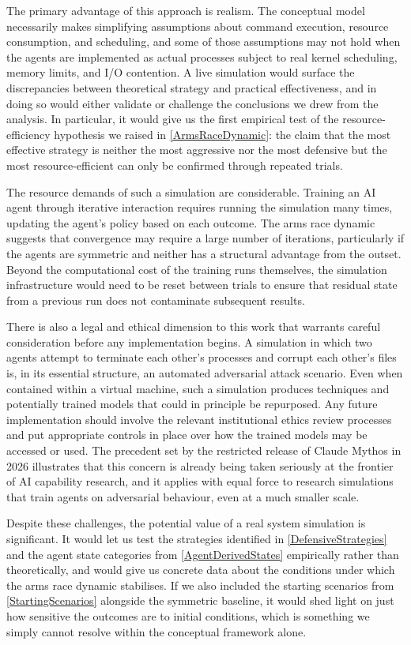 The primary advantage of this approach is realism. The conceptual model necessarily makes simplifying assumptions about command execution, resource consumption, and scheduling, and some of those assumptions may not hold when the agents are implemented as actual processes subject to real kernel scheduling, memory limits, and I/O contention. A live simulation would surface the discrepancies between theoretical strategy and practical effectiveness, and in doing so would either validate or challenge the conclusions we drew from the analysis. In particular, it would give us the first empirical test of the resource-efficiency hypothesis we raised in \autoref{ArmsRaceDynamic}: the claim that the most effective strategy is neither the most aggressive nor the most defensive but the most resource-efficient can only be confirmed through repeated trials.

The resource demands of such a simulation are considerable. Training an AI agent through iterative interaction requires running the simulation many times, updating the agent's policy based on each outcome. The arms race dynamic suggests that convergence may require a large number of iterations, particularly if the agents are symmetric and neither has a structural advantage from the outset. Beyond the computational cost of the training runs themselves, the simulation infrastructure would need to be reset between trials to ensure that residual state from a previous run does not contaminate subsequent results.

There is also a legal and ethical dimension to this work that warrants careful consideration before any implementation begins. A simulation in which two agents attempt to terminate each other's processes and corrupt each other's files is, in its essential structure, an automated adversarial attack scenario. Even when contained within a virtual machine, such a simulation produces techniques and potentially trained models that could in principle be repurposed. Any future implementation should involve the relevant institutional ethics review processes and put appropriate controls in place over how the trained models may be accessed or used. The precedent set by the restricted release of Claude Mythos in 2026 \parencite{MythosNature2026} illustrates that this concern is already being taken seriously at the frontier of AI capability research, and it applies with equal force to research simulations that train agents on adversarial behaviour, even at a much smaller scale.

Despite these challenges, the potential value of a real system simulation is significant. It would let us test the strategies identified in \autoref{DefensiveStrategies} and the agent state categories from \autoref{AgentDerivedStates} empirically rather than theoretically, and would give us concrete data about the conditions under which the arms race dynamic stabilises. If we also included the starting scenarios from \autoref{StartingScenarios} alongside the symmetric baseline, it would shed light on just how sensitive the outcomes are to initial conditions, which is something we simply cannot resolve within the conceptual framework alone.